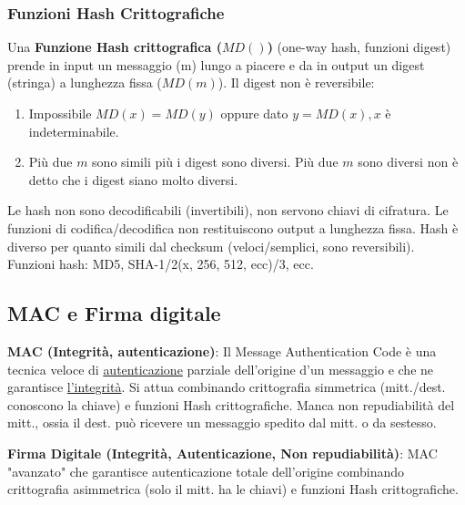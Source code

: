 \subsubsection{Funzioni Hash Crittografiche}
Una \textbf{Funzione Hash crittografica ($MD()$)} (one-way hash, funzioni digest) prende in input un messaggio (m) lungo a piacere e da in output un digest (stringa) a lunghezza fissa ($MD(m)$).
Il digest non è reversibile:
\begin{enumerate}
	\item Impossibile $MD(x)=MD(y)$ oppure dato $y=MD(x), x$ è indeterminabile.

	\item Più due $m$ sono simili più i digest sono diversi. Più due $m$ sono diversi non è detto che i digest siano molto diversi.
\end{enumerate}
Le hash non sono decodificabili (invertibili), non servono chiavi di cifratura. Le funzioni di codifica/decodifica non restituiscono output a lunghezza fissa.
Hash è diverso per quanto simili dal checksum (veloci/semplici, sono reversibili).
Funzioni hash: MD5, SHA-1/2(x, 256, 512, ecc)/3, ecc.

\subsection{MAC e Firma digitale}
\textbf{MAC (Integrità, autenticazione)}: Il Message Authentication Code è una tecnica veloce di \underline{autenticazione} parziale dell'origine d'un messaggio e che ne garantisce \underline{l'integrità}. Si attua combinando crittografia simmetrica (mitt./dest. conoscono la chiave) e funzioni Hash crittografiche. Manca non repudiabilità del mitt., ossia il dest. può ricevere un messaggio spedito dal mitt. o da sestesso.

\textbf{Firma Digitale (Integrità, Autenticazione, Non repudiabilità)}: MAC "avanzato" che garantisce autenticazione totale dell'origine combinando crittografia asimmetrica (solo il mitt. ha le chiavi) e funzioni Hash crittografiche.

